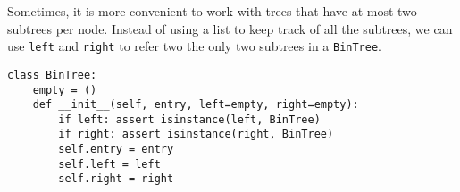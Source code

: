 Sometimes, it is more convenient to work with trees that have at most
two subtrees per node. Instead of using a list to keep track of all the
subtrees, we can use \texttt{left} and \texttt{right} to refer two the only two
subtrees in a \texttt{BinTree}.

\begin{lstlisting}
class BinTree:
    empty = ()
    def __init__(self, entry, left=empty, right=empty):
        if left: assert isinstance(left, BinTree)
        if right: assert isinstance(right, BinTree)
        self.entry = entry
        self.left = left
        self.right = right
\end{lstlisting}
